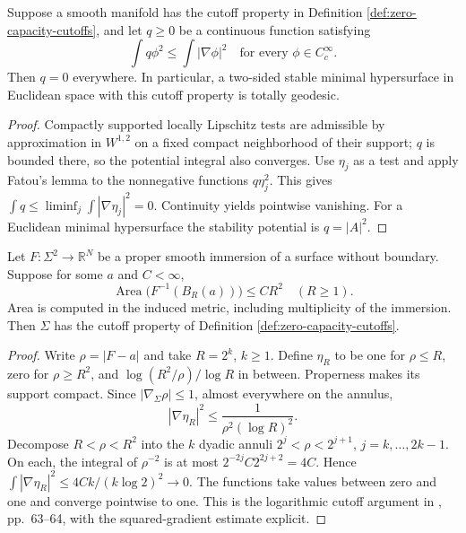 \begin{proposition}\label{prop:capacity-stability-rigidity}
Suppose a smooth manifold has the cutoff property in Definition \ref{def:zero-capacity-cutoffs}, and let $q\geq0$ be a continuous function satisfying
\[
 \int q\phi^2\leq\int|\nabla\phi|^2
 \quad\text{for every }\phi\in C_c^\infty.
\]
Then $q=0$ everywhere. In particular, a two-sided stable minimal hypersurface in Euclidean space with this cutoff property is totally geodesic.
\end{proposition}
\begin{proof}
Compactly supported locally Lipschitz tests are admissible by approximation in $W^{1,2}$ on a fixed compact neighborhood of their support; $q$ is bounded there, so the potential integral also converges. Use $\eta_j$ as a test and apply Fatou's lemma to the nonnegative functions $q\eta_j^2$. This gives $\int q\leq\liminf_j\int|\nabla\eta_j|^2=0$. Continuity yields pointwise vanishing. For a Euclidean minimal hypersurface the stability potential is $q=|A|^2$.
\end{proof}

\begin{proposition}\label{prop:quadratic-growth-cutoffs}
Let $F:\Sigma^2\to\mathbb R^N$ be a proper smooth immersion of a surface without boundary. Suppose for some $a$ and $C<\infty$,
\[
 \operatorname{Area}\bigl(F^{-1}(B_R(a))\bigr)\leq CR^2
 \quad(R\geq1).
\]
Area is computed in the induced metric, including multiplicity of the immersion. Then $\Sigma$ has the cutoff property of Definition \ref{def:zero-capacity-cutoffs}.
\end{proposition}
\begin{proof}
Write $\rho=|F-a|$ and take $R=2^k$, $k\geq1$. Define $\eta_R$ to be one for $\rho\leq R$, zero for $\rho\geq R^2$, and $\log(R^2/\rho)/\log R$ in between. Properness makes its support compact. Since $|\nabla_\Sigma\rho|\leq1$, almost everywhere on the annulus,
\[
 |\nabla\eta_R|^2\leq\frac{1}{\rho^2(\log R)^2}.
\]
Decompose $R<\rho<R^2$ into the $k$ dyadic annuli $2^j<\rho<2^{j+1}$, $j=k,\ldots,2k-1$. On each, the integral of $\rho^{-2}$ is at most $2^{-2j}C2^{2j+2}=4C$. Hence
$\int|\nabla\eta_R|^2\leq4Ck/(k\log2)^2\to0$.
The functions take values between zero and one and converge pointwise to one. This is the logarithmic cutoff argument in \cite{ChMin}, pp.~63--64, with the squared-gradient estimate explicit.
\end{proof}

